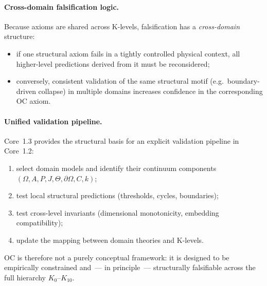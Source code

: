 \paragraph{Cross-domain falsification logic.}
Because axioms are shared across K-levels, falsification has a
\emph{cross-domain} structure:
\begin{itemize}
  \item if one structural axiom fails in a tightly controlled physical
        context, all higher-level predictions derived from it must be
        reconsidered;
  \item conversely, consistent validation of the same structural motif
        (e.g.\ boundary-driven collapse) in multiple domains increases
        confidence in the corresponding OC axiom.
\end{itemize}

\paragraph{Unified validation pipeline.}
Core~1.3 provides the structural basis for an explicit validation pipeline
in Core~1.2:
\begin{enumerate}
  \item select domain models and identify their continuum components
        \((\Omega, A, P, J, \Theta, \partial\Omega, C, k)\);
  \item test local structural predictions (thresholds, cycles, boundaries);
  \item test cross-level invariants (dimensional monotonicity,
        embedding compatibility);
  \item update the mapping between domain theories and K-levels.
\end{enumerate}

OC is therefore not a purely conceptual framework: it is designed to be
empirically constrained and~— in principle~— structurally falsifiable across
the full hierarchy \(K_0\)–\(K_{10}\).

